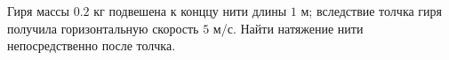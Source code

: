 Гиря массы $0.2$ кг подвешена к конццу нити длины $1$ м;
вследствие толчка гиря получила горизонтальную скорость $5$ м/с.
Найти натяжение нити непосредственно после толчка.
